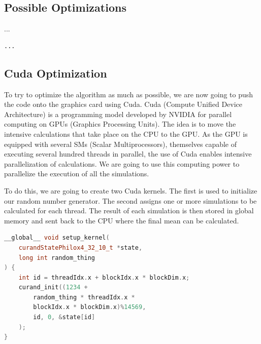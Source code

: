 \documentclass[12pt,a4paper]{report}
\begin{document}
\subsection{Possible Optimizations}
...

\begin{lstlisting}[language=Python, caption={Optimized Monte Carlo Simulation}]
...
\end{lstlisting}

\subsection{Cuda Optimization}
To try to optimize the algorithm as much as possible, we are now going to push the code onto the graphics card using Cuda. Cuda (Compute Unified Device Architecture) is a programming model developed by NVIDIA for parallel computing on GPUs (Graphics Processing Units). The idea is to move the intensive calculations that take place on the CPU to the GPU. As the GPU is equipped with several SMs (Scalar Multiprocessors), themselves capable of executing several hundred threads in parallel, the use of Cuda enables intensive parallelization of calculations. We are going to use this computing power to parallelize the execution of all the simulations. 

To do this, we are going to create two Cuda kernels. The first is used to initialize our random number generator. The second assigns one or more simulations to be calculated for each thread. The result of each simulation is then stored in global memory and sent back to the CPU where the final mean can be calculated. 


\begin{tcolorbox}[colback=green!5!white, colframe=green!75!black, title=Cuda random number generator]
\begin{lstlisting}[language=C++]
__global__ void setup_kernel(
    curandStatePhilox4_32_10_t *state, 
    long int random_thing
) {
    int id = threadIdx.x + blockIdx.x * blockDim.x;
    curand_init((1234 + 
        random_thing * threadIdx.x * 
        blockIdx.x * blockDim.x)%14569, 
        id, 0, &state[id]
    );
}
\end{lstlisting}
\end{tcolorbox}
\end{document}

